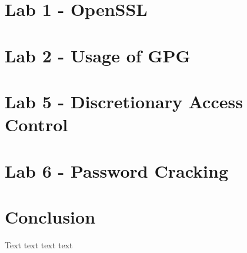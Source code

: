 \documentclass[12pt]{report}
\begin{document}
    \chapter{Lab 1 - OpenSSL}\label{ch:lab1}
    

    \newpage

    \chapter{Lab 2 - Usage of GPG}\label{ch:lab2}
    

    \chapter{Lab 5 - Discretionary Access Control}\label{ch:lab5}
    

    \chapter{Lab 6 - Password Cracking}\label{ch:lab6n}
    

    \chapter*{Conclusion}\label{ch:conclusion}

    Text text text text

    \printbibliography
\end{document}
